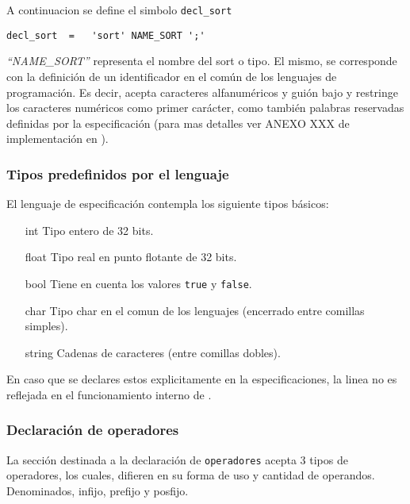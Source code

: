 A continuacion se define el simbolo \texttt{decl\_sort}
\begin{center}
\lstset{language=inform}
\scriptsize
\begin{lstlisting}[frame=single]
decl_sort  =   'sort' NAME_SORT ';'
\end{lstlisting}
\end{center}
\textit{``NAME\_SORT''} representa el nombre del sort o tipo. El mismo, se corresponde con la definición de un identificador en el común de los lenguajes de programación. Es decir, acepta caracteres alfanuméricos y guión bajo y restringe los caracteres numéricos como primer carácter, como también palabras reservadas definidas por la especificación (para mas detalles ver ANEXO  XXX de implementación en \spirit).\\


\subsubsection*{Tipos predefinidos por el lenguaje}
\label{sec:typepredefined}
El lenguaje de especificación contempla los siguiente tipos básicos:
\begin{itemize}
\item [int] Tipo entero de 32 bits.
\item [float] Tipo real en punto flotante de 32 bits.
\item [bool] Tiene en cuenta los valores \texttt{true} y \texttt{false}.
\item [char] Tipo char en el comun de los lenguajes (encerrado entre comillas simples).
\item [string] Cadenas de caracteres (entre comillas dobles).
\end{itemize}
En caso que se declares estos explicitamente en la especificaciones, la linea no es reflejada en el funcionamiento interno de \maggen.

\subsubsection{Declaración de operadores}
La sección destinada a la declaración de \texttt{operadores} acepta 3 tipos de operadores, los cuales, difieren en su forma de uso y cantidad de operandos. Denominados, infijo, prefijo y posfijo. 

